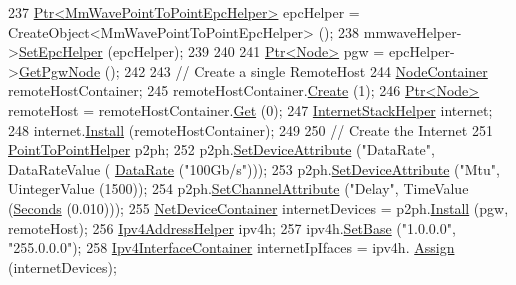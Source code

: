 \begin{DoxyCode}
237         \hyperlink{classns3_1_1Ptr}{Ptr<MmWavePointToPointEpcHelper>}  epcHelper = 
      CreateObject<MmWavePointToPointEpcHelper> ();
238         mmwaveHelper->\hyperlink{classns3_1_1MmWaveHelper_a54fc98a649a710153b479d0878558733}{SetEpcHelper} (epcHelper);
239 
240 
241         \hyperlink{classns3_1_1Ptr}{Ptr<Node>} pgw = epcHelper->\hyperlink{classns3_1_1MmWavePointToPointEpcHelper_a586f072ee5b09376531ba605b3fed05f}{GetPgwNode} ();
242 
243         \textcolor{comment}{// Create a single RemoteHost}
244         \hyperlink{classns3_1_1NodeContainer}{NodeContainer} remoteHostContainer;
245         remoteHostContainer.\hyperlink{classns3_1_1NodeContainer_a787f059e2813e8b951cc6914d11dfe69}{Create} (1);
246         \hyperlink{classns3_1_1Ptr}{Ptr<Node>} remoteHost = remoteHostContainer.\hyperlink{classns3_1_1NodeContainer_a9ed96e2ecc22e0f5a3d4842eb9bf90bf}{Get} (0);
247         \hyperlink{classns3_1_1InternetStackHelper}{InternetStackHelper} internet;
248         internet.\hyperlink{classns3_1_1InternetStackHelper_a6645b412f31283d2d9bc3d8a95cebbc0}{Install} (remoteHostContainer);
249 
250         \textcolor{comment}{// Create the Internet}
251         \hyperlink{classns3_1_1PointToPointHelper}{PointToPointHelper} p2ph;
252         p2ph.\hyperlink{classns3_1_1PointToPointHelper_a4577f5ab8c387e5528af2e0fbab1152e}{SetDeviceAttribute} (\textcolor{stringliteral}{"DataRate"}, DataRateValue (
      \hyperlink{classns3_1_1DataRate}{DataRate} (\textcolor{stringliteral}{"100Gb/s"})));
253         p2ph.\hyperlink{classns3_1_1PointToPointHelper_a4577f5ab8c387e5528af2e0fbab1152e}{SetDeviceAttribute} (\textcolor{stringliteral}{"Mtu"}, UintegerValue (1500));
254         p2ph.\hyperlink{classns3_1_1PointToPointHelper_a6b5317fd17fb61e5a53f8d66a90b63b9}{SetChannelAttribute} (\textcolor{stringliteral}{"Delay"}, TimeValue (\hyperlink{group__timecivil_ga33c34b816f8ff6628e33d5c8e9713b9e}{Seconds} (0.010)));
255         \hyperlink{classns3_1_1NetDeviceContainer}{NetDeviceContainer} internetDevices = p2ph.\hyperlink{classns3_1_1PointToPointHelper_ab9162fea3e88722666fed1106df1f9ec}{Install} (pgw, remoteHost);
256         \hyperlink{classns3_1_1Ipv4AddressHelper}{Ipv4AddressHelper} ipv4h;
257         ipv4h.\hyperlink{classns3_1_1Ipv4AddressHelper_acf7b16dd25bac67e00f5e25f90a9a035}{SetBase} (\textcolor{stringliteral}{"1.0.0.0"}, \textcolor{stringliteral}{"255.0.0.0"});
258         \hyperlink{classns3_1_1Ipv4InterfaceContainer}{Ipv4InterfaceContainer} internetIpIfaces = ipv4h.
      \hyperlink{classns3_1_1Ipv4AddressHelper_af8e7f4a1a7e74c00014a1eac445a27af}{Assign} (internetDevices);

\end{DoxyCode}
